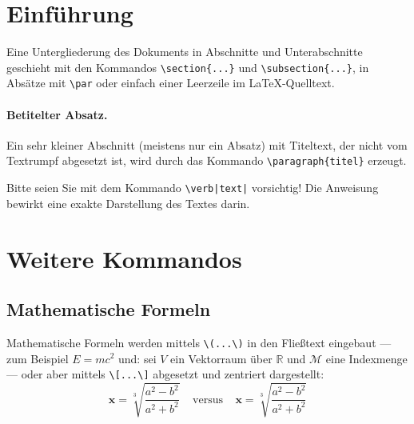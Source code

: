 %
%

\section{Einführung}
Eine Untergliederung des Dokuments in Abschnitte und Unterabschnitte
geschieht mit den Kommandos \verb|\section{...}| und \verb|\subsection{...}|,
in Absätze mit \verb|\par| oder einfach einer Leerzeile im \LaTeX-Quelltext.

\paragraph{Betitelter Absatz.}
Ein sehr kleiner Abschnitt (meistens nur ein Absatz)
mit Titeltext, der nicht vom Textrumpf abgesetzt ist, wird durch das Kommando
\verb|\paragraph{titel}| erzeugt.

Bitte seien Sie mit dem Kommando \verb?\verb|text|? vorsichtig! Die Anweisung bewirkt eine exakte Darstellung des Textes darin.

%
%

\section{Weitere Kommandos}

\subsection{Mathematische Formeln}\label{sec:formeln}

Mathematische Formeln werden mittels \verb|\(...\)|
in den Fließtext eingebaut
--- zum Beispiel \( E=mc^2 \) und:
sei \(V\) ein Vektorraum über \(\mathbb{R}\)
und \(\mathcal{M}\) eine Indexmenge
---
oder aber mittels \verb|\[...\]|
abgesetzt und zentriert dargestellt:
\[
    \pmb{x} = \sqrt[3]{\frac{a^2-b^2}{a^2+b^2}}
    ~~~~~ \text{versus} ~~~~~
    \boldsymbol{x} = \sqrt[3]{\frac{a^2-b^2}{a^2+b^2}}
\]


